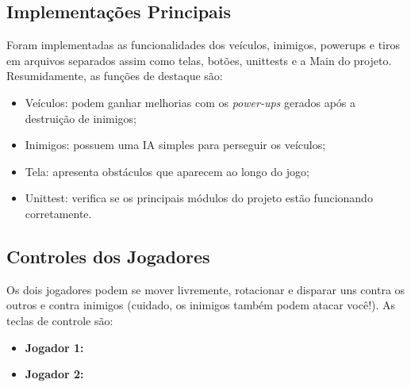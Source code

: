 \documentclass[12pt,a4paper]{article}
\begin{document}
\subsection{Implementações Principais}
Foram implementadas as funcionalidades dos veículos, inimigos, powerups e tiros em arquivos separados assim como telas, botões, unittests e a Main do projeto. Resumidamente, as funções de destaque são:
\begin{itemize}
    \item Veículos: podem ganhar melhorias com os \textit{power-ups} gerados após a destruição de inimigos;
    \item Inimigos: possuem uma IA simples para perseguir os veículos;
    \item Tela: apresenta obstáculos que aparecem ao longo do jogo;
    \item Unittest: verifica se os principais módulos do projeto estão funcionando corretamente.
\end{itemize}

\subsection{Controles dos Jogadores}
Os dois jogadores podem se mover livremente, rotacionar e disparar uns contra os outros e contra inimigos (cuidado, os inimigos também podem atacar você!). As teclas de controle são:

\begin{itemize}
    \item \textbf{Jogador 1:}
    \item \textbf{Jogador 2:}
\end{itemize}
\end{document}
